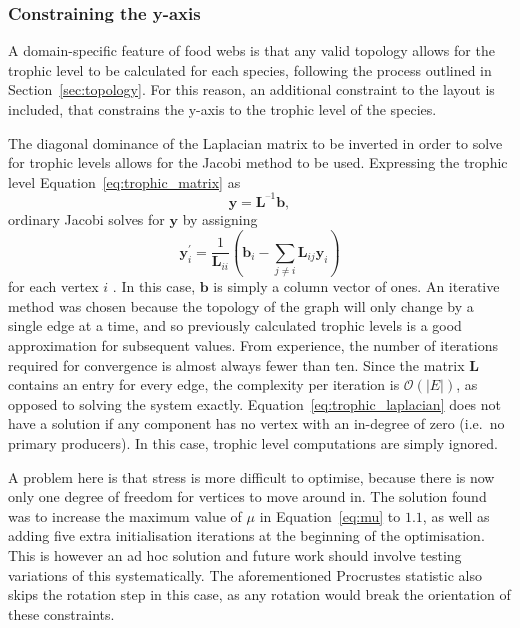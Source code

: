 \subsubsection{Constraining the y-axis}
A domain-specific feature of food webs is that any valid topology allows for the trophic level to be calculated for each species, following the process outlined in Section~\ref{sec:topology}. For this reason, an additional constraint to the layout is included, that constrains the y-axis to the trophic level of the species.

The diagonal dominance of the Laplacian matrix to be inverted in order to solve for trophic levels allows for the Jacobi method to be used. Expressing the trophic level Equation~\eqref{eq:trophic_matrix} as 
\begin{equation}
  \mathbf{y} = \mathbf{L}^{\text{--}1}\mathbf{b},
  \label{eq:trophic_laplacian}
\end{equation}
ordinary Jacobi solves for $\mathbf{y}$ by assigning
\begin{equation}
  \mathbf{y}_i^\prime = \frac{1}{\mathbf{L}_{ii}}\left(\mathbf{b}_i - \sum_{j\neq i}\mathbf{L}_{ij}\mathbf{y}_i\right)
\end{equation}
for each vertex $i$ \cite{Young2014}. In this case, $\mathbf{b}$ is simply a column vector of ones.
An iterative method was chosen because the topology of the graph will only change by a single edge at a time, and so previously calculated trophic levels is a good approximation for subsequent values. From experience, the number of iterations required for convergence is almost always fewer than ten. Since the matrix $\mathbf{L}$ contains an entry for every edge, the complexity per iteration is $\mathcal{O}(|E|)$, as opposed to solving the system exactly. 
Equation~\eqref{eq:trophic_laplacian} does not have a solution if any component has no vertex with an in-degree of zero (i.e.\ no primary producers). In this case, trophic level computations are simply ignored.

A problem here is that stress is more difficult to optimise, because there is now only one degree of freedom for vertices to move around in. The solution found was to increase the maximum value of $\mu$ in Equation~\eqref{eq:mu} to $1.1$, as well as adding five extra initialisation iterations at the beginning of the optimisation. This is however an ad hoc solution and future work should involve testing variations of this systematically.
The aforementioned Procrustes statistic also skips the rotation step in this case, as any rotation would break the orientation of these constraints.

